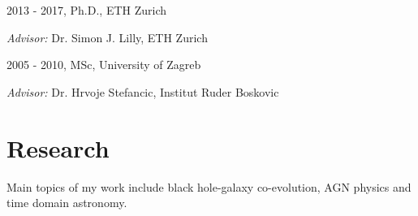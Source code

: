 \documentclass[11pt,letterpaper]{article}
\renewenvironment{itemize}{
  \begin{list}{}{
    \setlength{\leftmargin}{1.5em}
    \setlength{\itemsep}{0.15em}
    \setlength{\parskip}{0pt}
    \setlength{\parsep}{0.25em}
  }
}{
  \end{list}
}
\begin{document}
\begin{itemize}
  \item 2013 - 2017, Ph.D., ETH Zurich
  \begin{itemize}
  \item \textit{Advisor:} Dr. Simon J. Lilly, ETH Zurich

\end{itemize}  




  \item 2005 - 2010, MSc, University of Zagreb
  \begin{itemize}
            \item \textit{Advisor:}
      Dr. Hrvoje  Stefancic, Institut Ruder Boskovic

\end{itemize}  
\end{itemize}

\section*{Research}
 Main topics of my work include black hole-galaxy co-evolution, AGN physics and time domain astronomy. %
 
\end{document}
